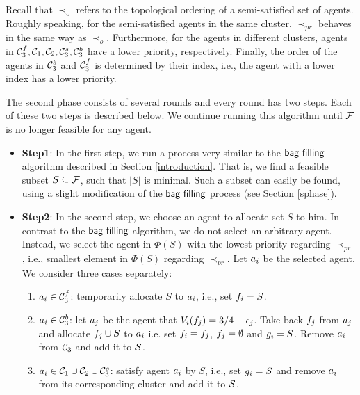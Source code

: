 Recall that $\prec_o$ refers to the topological ordering of a semi-satisfied set of agents. Roughly speaking, for the semi-satisfied agents in the same cluster, $\prec_{pr}$ behaves in the same way as $\prec_{o}$. Furthermore, for the agents in different clusters, agents in $\mathcal{C}_3^f , \mathcal{C}_1 , \mathcal{C}_2, \mathcal{C}_3^s , \mathcal{C}_3^b$ have a lower priority, respectively. Finally, the order of the agents in $\mathcal{C}_3^b$ and $\mathcal{C}_3^f$ is determined by their index, i.e., the agent with a lower index has a lower priority.


The second phase consists of several rounds and every round has two steps. Each of these two steps is described below. We continue running this algorithm until $\mathcal{F}$ is no longer feasible for any agent.
\begin{itemize}
\item \textbf{Step1}: In the first step, we run a process very similar to the $\textsf{bag filling}$ algorithm described in Section \ref{introduction}. That is, we find a feasible subset $S \subseteq \mathcal{F}$, such that $|S|$ is minimal. Such a subset can easily be found, using a slight modification of the $\textsf{bag filling}$ process (see Section \ref{sphase}).  

\item \textbf{Step2}: In the second step, we choose an agent to allocate set $S$ to him. In contrast to the $\textsf{bag filling}$ algorithm, we do not select an arbitrary agent. Instead, we select the agent in $\Phi(S)$ with the lowest priority regarding $\prec_{pr}$, i.e., smallest element in $\Phi(S)$ regarding $\prec_{pr}$. Let $a_i$ be the selected agent. We consider three cases separately:

\begin{minipage}[t]{\linegoal}
\begin{enumerate}[leftmargin=50pt]
    \item $a_i \in \mathcal{C}_3^f$: temporarily allocate $S$ to $a_i$, i.e., set $f_i = S$. 
    \item $a_i \in \mathcal{C}_3^b$: let $a_j$ be the agent that $V_i(f_j) = {3/4} - \epsilon_j$. 
Take back $f_j$ from $a_j$ and allocate $f_j \cup S$ to $a_i$ i.e. set $f_i = f_j$, $f_j=\emptyset$ and $g_i = S$. Remove $a_i$ from $\mathcal{C}_3$ and add it to $\mathcal{S}$.
    \item $a_i \in \mathcal{C}_1 \cup \mathcal{C}_2 \cup \mathcal{C}_3^s$: satisfy agent $a_i$ by $S$, i.e., set $g_i = S$ and remove $a_i$ from its corresponding cluster and add it to $\mathcal{S}$. 
\end{enumerate}
\end{minipage}


\end{itemize}
